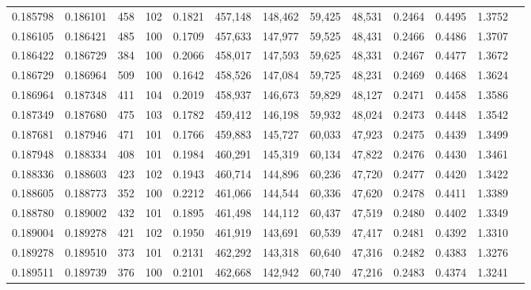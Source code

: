 \begin{tabular}{rrrrrrrrrrrrr}
0.185798 & 0.186101 &   458 & 102 &                                     0.1821 & 457,148 & 148,462 &  59,425 &  48,531 & 0.2464 & 0.4495 & 1.3752 \\
0.186105 & 0.186421 &   485 & 100 &                                     0.1709 & 457,633 & 147,977 &  59,525 &  48,431 & 0.2466 & 0.4486 & 1.3707 \\
0.186422 & 0.186729 &   384 & 100 &                                     0.2066 & 458,017 & 147,593 &  59,625 &  48,331 & 0.2467 & 0.4477 & 1.3672 \\
0.186729 & 0.186964 &   509 & 100 &                                     0.1642 & 458,526 & 147,084 &  59,725 &  48,231 & 0.2469 & 0.4468 & 1.3624 \\
0.186964 & 0.187348 &   411 & 104 &                                     0.2019 & 458,937 & 146,673 &  59,829 &  48,127 & 0.2471 & 0.4458 & 1.3586 \\
0.187349 & 0.187680 &   475 & 103 &                                     0.1782 & 459,412 & 146,198 &  59,932 &  48,024 & 0.2473 & 0.4448 & 1.3542 \\
0.187681 & 0.187946 &   471 & 101 &                                     0.1766 & 459,883 & 145,727 &  60,033 &  47,923 & 0.2475 & 0.4439 & 1.3499 \\
0.187948 & 0.188334 &   408 & 101 &                                     0.1984 & 460,291 & 145,319 &  60,134 &  47,822 & 0.2476 & 0.4430 & 1.3461 \\
0.188336 & 0.188603 &   423 & 102 &                                     0.1943 & 460,714 & 144,896 &  60,236 &  47,720 & 0.2477 & 0.4420 & 1.3422 \\
0.188605 & 0.188773 &   352 & 100 &                                     0.2212 & 461,066 & 144,544 &  60,336 &  47,620 & 0.2478 & 0.4411 & 1.3389 \\
0.188780 & 0.189002 &   432 & 101 &                                     0.1895 & 461,498 & 144,112 &  60,437 &  47,519 & 0.2480 & 0.4402 & 1.3349 \\
0.189004 & 0.189278 &   421 & 102 &                                     0.1950 & 461,919 & 143,691 &  60,539 &  47,417 & 0.2481 & 0.4392 & 1.3310 \\
0.189278 & 0.189510 &   373 & 101 &                                     0.2131 & 462,292 & 143,318 &  60,640 &  47,316 & 0.2482 & 0.4383 & 1.3276 \\
0.189511 & 0.189739 &   376 & 100 &                                     0.2101 & 462,668 & 142,942 &  60,740 &  47,216 & 0.2483 & 0.4374 & 1.3241 \\

\end{tabular}
